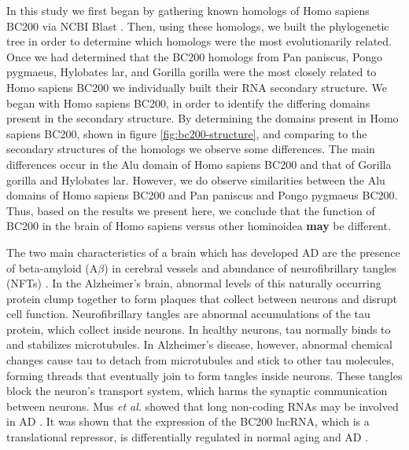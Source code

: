 \documentclass[conference, 11pt]{IEEEtran}
\begin{document}
In this study we first began by gathering known homologs of Homo sapiens BC200 via NCBI Blast \cite{blastTool,madden2012blast}. Then, using these homologs, we built the phylogenetic tree in order to determine which homologs were the most evolutionarily related. Once we had determined that the BC200 homologs from Pan paniscus, Pongo pygmaeus, Hylobates lar, and Gorilla gorilla were the most closely related to Homo sapiens BC200 we individually built their RNA secondary structure. We began with Homo sapiens BC200, in order to identify the differing domains present in the secondary structure. By determining the domains present in Homo sapiens BC200, shown in figure \ref{fig:bc200-structure}, and comparing to the secondary structures of the homologs we observe some differences. The main differences occur in the Alu domain of Homo sapiens BC200 and that of Gorilla gorilla and Hylobates lar. However, we do observe similarities between the Alu domains of Homo sapiens BC200 and Pan paniscus and Pongo pygmaeus BC200. Thus, based on the results we present here, we conclude that the function of BC200 in the brain of Homo sapiens versus other hominoidea \textbf{may} be different. 


The two main characteristics of a brain which has developed AD are the presence of beta-amyloid (A$\beta$) in cerebral vessels and abundance of neurofibrillary tangles (NFTs) \cite{deture2019neuropathological}. In the Alzheimer’s brain, abnormal levels of this naturally occurring protein clump together to form plaques that collect between neurons and disrupt cell function. Neurofibrillary tangles are abnormal accumulations of the tau protein, which collect inside neurons.  In healthy neurons, tau normally binds to and stabilizes microtubules. In Alzheimer’s disease, however, abnormal chemical changes cause tau to detach from microtubules and stick to other tau molecules, forming threads that eventually join to form tangles inside neurons. These tangles block the neuron’s transport system, which harms the synaptic communication between neurons\cite{swerdlow2011brain}. Mus \emph{et al.} showed that long non-coding RNAs may be involved in AD \cite{mus2007dendritic}. It was shown that the expression of the BC200 lncRNA, which is a translational repressor, is differentially regulated in normal aging and AD \cite{mus2007dendritic}. 
\end{document}
